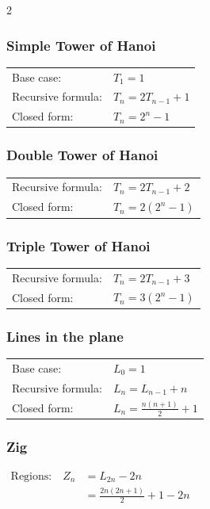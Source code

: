 \vspace*{-\baselineskip}

\begin{multicols}{2}
\subsubsection{Simple Tower of Hanoi}
\begin{tabular}{ll}
   Base case: & $T_1 = 1$ \\
   Recursive formula: & $T_n = 2T_{n-1} + 1$ \\
   Closed form: & $T_n = 2^n - 1$
\end{tabular}

\subsubsection{Double Tower of Hanoi}
\begin{tabular}{ll}
   Recursive formula: & $T_n = 2T_{n-1} + 2$ \\
   Closed form: & $T_n = 2(2^n - 1)$
\end{tabular}

\subsubsection{Triple Tower of Hanoi}
\begin{tabular}{ll}
   Recursive formula: & $T_n = 2T_{n-1} + 3$ \\
   Closed form: & $T_n = 3(2^n - 1)$
\end{tabular}

\columnbreak

\subsubsection{Lines in the plane}
\begin{tabular}{ll}
   Base case: & $L_0 = 1$ \\
   Recursive formula: & $L_n = L_{n-1} + n$ \\
   Closed form: & $L_n = \frac{n(n+1)}{2}+1$
\end{tabular}


\subsubsection{Zig}
$\begin{aligned}
\text{Regions:} \quad Z_n &= L_{2n} - 2n\\
       &= \frac{2n(2n+1)}{2} + 1 - 2n \\
\end{aligned}$


\end{multicols}
